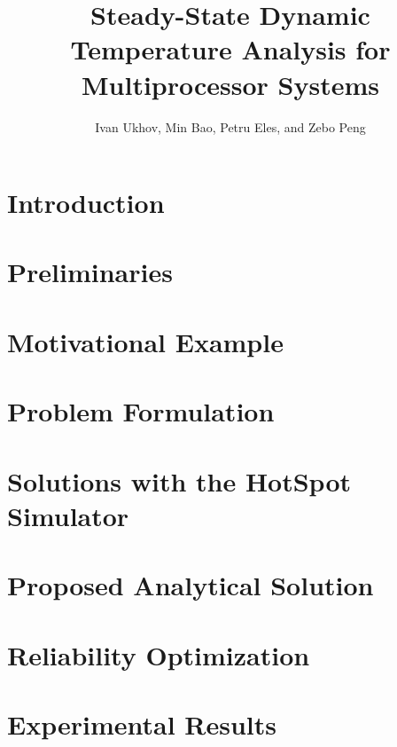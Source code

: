 \documentclass[conference]{IEEEtran}
\title{Steady-State Dynamic Temperature Analysis for Multiprocessor Systems}
\author{Ivan Ukhov, Min Bao, Petru Eles, and Zebo Peng}
\begin{document}
  \maketitle

  \begin{abstract}
    
  \end{abstract}

  \section{Introduction}
  

  \section{Preliminaries} \label{sec:preliminaries}
  

  \section{Motivational Example} \label{sec:motivation}
  

  \section{Problem Formulation} \label{sec:problem}
  

  \section{Solutions with the HotSpot Simulator} \label{sec:hotspot-solution}
  

  \section{Proposed Analytical Solution} \label{sec:analytical-solution}
  

  \section{Reliability Optimization} \label{sec:reliability}
  

  \section{Experimental Results} \label{sec:results}
  
\end{document}
